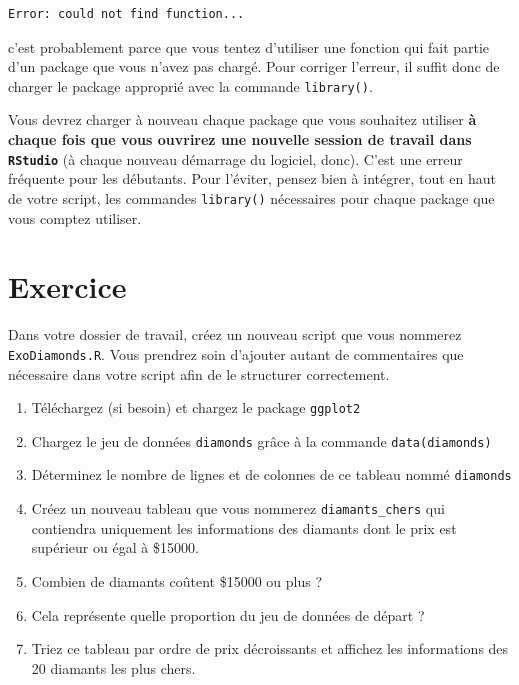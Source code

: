 \documentclass[
  a4paper,
  DIV=11,
  numbers=noendperiod,
  oneside]{scrreprt}
\providecommand{\tightlist}{%
  \setlength{\itemsep}{0pt}\setlength{\parskip}{0pt}}\usepackage{longtable,booktabs,array}
\begin{document}
\begin{verbatim}
Error: could not find function...
\end{verbatim}

c'est probablement parce que vous tentez d'utiliser une fonction qui
fait partie d'un package que vous n'avez pas chargé. Pour corriger
l'erreur, il suffit donc de charger le package approprié avec la
commande \texttt{library()}.

\begin{tcolorbox}[enhanced jigsaw, coltitle=black, toprule=.15mm, opacityback=0, breakable, colback=white, opacitybacktitle=0.6, colframe=quarto-callout-note-color-frame, leftrule=.75mm, rightrule=.15mm, titlerule=0mm, bottomtitle=1mm, toptitle=1mm, arc=.35mm, title=\textcolor{quarto-callout-note-color}{\faInfo}\hspace{0.5em}{Note : \texttt{library()}}, colbacktitle=quarto-callout-note-color!10!white, bottomrule=.15mm, left=2mm]

Vous devrez charger à nouveau chaque package que vous souhaitez utiliser
\textbf{à chaque fois que vous ouvrirez une nouvelle session de travail
dans \texttt{RStudio}} (à chaque nouveau démarrage du logiciel, donc).
C'est une erreur fréquente pour les débutants. Pour l'éviter, pensez
bien à intégrer, tout en haut de votre script, les commandes
\texttt{library()} nécessaires pour chaque package que vous comptez
utiliser.

\end{tcolorbox}

\section{Exercice}\label{sec-exo-1}

Dans votre dossier de travail, créez un nouveau script que vous nommerez
\texttt{ExoDiamonds.R}. Vous prendrez soin d'ajouter autant de
commentaires que nécessaire dans votre script afin de le structurer
correctement.

\begin{enumerate}
\def\labelenumi{\arabic{enumi}.}
\tightlist
\item
  Téléchargez (si besoin) et chargez le package \texttt{ggplot2}
\item
  Chargez le jeu de données \texttt{diamonds} grâce à la commande
  \texttt{data(diamonds)}
\item
  Déterminez le nombre de lignes et de colonnes de ce tableau nommé
  \texttt{diamonds}
\item
  Créez un nouveau tableau que vous nommerez \texttt{diamants\_chers}
  qui contiendra uniquement les informations des diamants dont le prix
  est supérieur ou égal à \$15000.
\item
  Combien de diamants coûtent \$15000 ou plus ?
\item
  Cela représente quelle proportion du jeu de données de départ ?
\item
  Triez ce tableau par ordre de prix décroissants et affichez les
  informations des 20 diamants les plus chers.
\end{enumerate}
\end{document}
